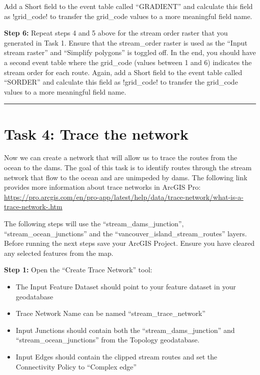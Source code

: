 \documentclass[
]{book}
\begin{document}
Add a Short field to the event table called ``GRADIENT'' and calculate this field as !grid\_code! to transfer the grid\_code values to a more meaningful field name.

\textbf{Step 6:} Repeat steps 4 and 5 above for the stream order raster that you generated in Task 1. Ensure that the stream\_order raster is used as the ``Input stream raster'' and ``Simplify polygons'' is toggled off. In the end, you should have a second event table where the grid\_code (values between 1 and 6) indicates the stream order for each route. Again, add a Short field to the event table called ``SORDER'' and calculate this field as !grid\_code! to transfer the grid\_code values to a more meaningful field name.

\begin{center}\rule{0.5\linewidth}{0.5pt}\end{center}

\hypertarget{task-4-trace-the-network}{%
\section*{Task 4: Trace the network}\label{task-4-trace-the-network}}

Now we can create a network that will allow us to trace the routes from the ocean to the dams. The goal of this task is to identify routes through the stream network that flow to the ocean and are unimpeded by dams. The following link provides more information about trace networks in ArcGIS Pro: \url{https://pro.arcgis.com/en/pro-app/latest/help/data/trace-network/what-is-a-trace-network-.htm}

The following steps will use the ``stream\_dams\_junction'', ``stream\_ocean\_junctions'' and the ``vancouver\_island\_stream\_routes'' layers. Before running the next steps save your ArcGIS Project. Ensure you have cleared any selected features from the map.

\textbf{Step 1:} Open the ``Create Trace Network'' tool:

\begin{itemize}
\item
  The Input Feature Dataset should point to your feature dataset in your geodatabase
\item
  Trace Network Name can be named ``stream\_trace\_network''
\item
  Input Junctions should contain both the ``stream\_dams\_junction'' and ``stream\_ocean\_junctions'' from the Topology geodatabase.
\item
  Input Edges should contain the clipped stream routes and set the Connectivity Policy to ``Complex edge''
\end{itemize}
\end{document}

